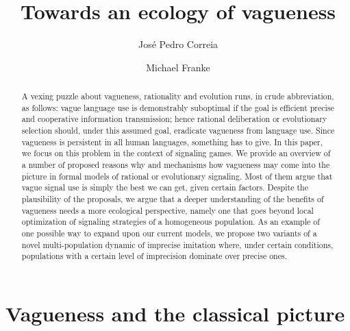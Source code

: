 \documentclass[a4paper]{article}
\begin{document}
\title{Towards an ecology of vagueness}
\author{Jos\'e Pedro Correia \and Michael Franke}
\date{}

\maketitle

\begin{abstract}
A vexing puzzle about vagueness, rationality and evolution runs, in crude abbreviation, as follows: vague language use is demonstrably suboptimal if the goal is efficient precise and cooperative information transmission; hence rational deliberation or evolutionary selection should, under this assumed goal, eradicate vagueness from language use.
Since vagueness is persistent in all human languages, something has to give.
In this paper, we focus on this problem in the context of signaling games.
We provide an overview of a number of proposed reasons why and mechanisms how vagueness may come into the picture in formal models of rational or evolutionary signaling.
Most of them argue that vague signal use is simply the best we can get, given certain factors.
Despite the plausibility of the proposals, we argue that a deeper understanding of the benefits of vagueness needs a more ecological perspective, namely one that goes beyond local optimization of signaling strategies of a homogeneous population.
As an example of one possible way to expand upon our current models, we propose two variants of a novel multi-population dynamic of imprecise imitation where, under certain conditions, populations with a certain level of imprecision dominate over precise ones.
\end{abstract}

\tableofcontents


\section{Vagueness and the classical picture}
\label{sec:vagueness}
\end{document}
